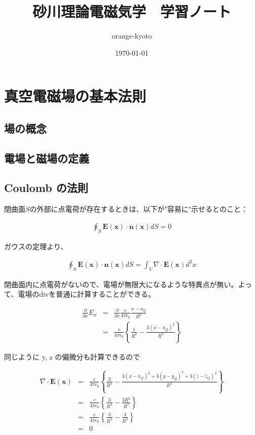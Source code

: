 \documentclass[a4j,12pt,uplatex,dvipdfmx]{jsreport}
\title{砂川理論電磁気学　学習ノート}
\author{orange-kyoto}
\date{\today}
\begin{document}
\maketitle

\tableofcontents
\clearpage


\chapter{真空電磁場の基本法則}

\section{場の概念}

\section{電場と磁場の定義}

\section{Coulomb の法則}

閉曲面$S$の外部に点電荷が存在するときは、以下が"容易に"示せるとのこと：

\begin{eqnarray*}
    \oint_{S} \bm{E}(\bm{x}) \cdot \bm{n}(\bm{x}) dS = 0
\end{eqnarray*}

ガウスの定理より、

\begin{eqnarray*}
    \oint_{S} \bm{E}(\bm{x}) \cdot \bm{n}(\bm{x}) dS = \int_{V} \nabla \cdot \bm{E}(\bm{x}) d^3 x
\end{eqnarray*}

閉曲面内に点電荷がないので、電場が無限大になるような特異点が無い。よって、電場のdivを普通に計算することができる。

\begin{eqnarray*}
    \frac{\partial}{\partial x} E_{x} 
    &=& \frac{\partial}{\partial x} \frac{e}{4 \pi \epsilon_0} \frac{x - x_{Q}}{R^3} \\
    &=& \frac{e}{4 \pi \epsilon_0} \left\{ \frac{1}{R^3} - \frac{3 ( x - x_{Q} )^2}{R^5} \right\} 
\end{eqnarray*}

同じように y, z の偏微分も計算できるので

\begin{eqnarray*}
    \nabla \cdot \bm{E}(\bm{x}) &=& \frac{e}{4 \pi \epsilon_0} \left\{ \frac{3}{R^3} - \frac{3 ( x - x_{Q} )^2 + 3 ( y - y_{Q} )^2 + 3 ( z - z_{Q} )^2}{R^5} \right\} \\
    &=& \frac{e}{4 \pi \epsilon_0} \left\{ \frac{3}{R^3} - \frac{3 R^2}{R^5} \right\} \\
    &=& \frac{e}{4 \pi \epsilon_0} \left\{ \frac{3}{R^3} - \frac{3}{R^3} \right\} \\
    &=& 0
\end{eqnarray*}
\end{document}
